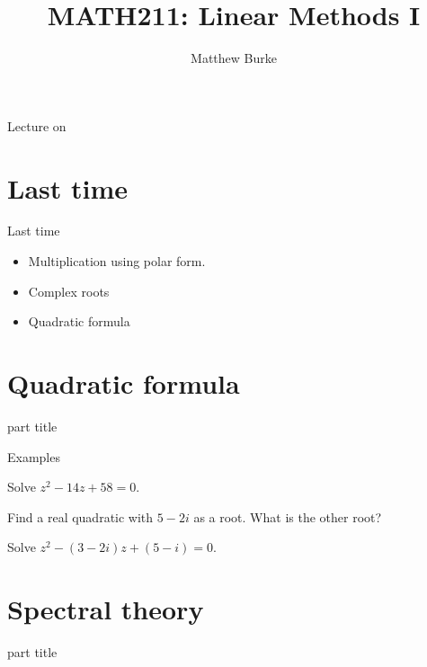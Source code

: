 \documentclass{beamer}
\title{MATH211: Linear Methods I}
\author{Matthew Burke}
\date{\lectureDate}
\newcommand{\lectureDate}{\formatdate{27}{11}{2018}}
\begin{document}
\frame{\titlepage}

\begin{frame}{Lecture on \lectureDate}
  \tableofcontents
\end{frame}

\section*{Last time}
\label{sec:Last-time}

\begin{frame}{Last time}
	\begin{itemize}
		\item Multiplication using polar form.\vfill
		\item Complex roots\vfill
		\item Quadratic formula
	\end{itemize}
\end{frame}

\section{Quadratic formula}

\begin{frame}
\begin{beamercolorbox}[sep=12pt,center]{part title}
\insertsection\par
\end{beamercolorbox}
\end{frame}

\begin{frame}{Examples}
\begin{example}
Solve $z^2-14z+58 = 0$.
\end{example}
\begin{example}
Find a real quadratic with $5-2i$ as a root. What is the other root?
\end{example}
\begin{example}
Solve $z^2-(3-2i)z + (5-i) = 0$.
\end{example}
\end{frame}

\section{Spectral theory}

\begin{frame}
\begin{beamercolorbox}[sep=12pt,center]{part title}
\insertsection\par
\end{beamercolorbox}
\end{frame}
\end{document}
